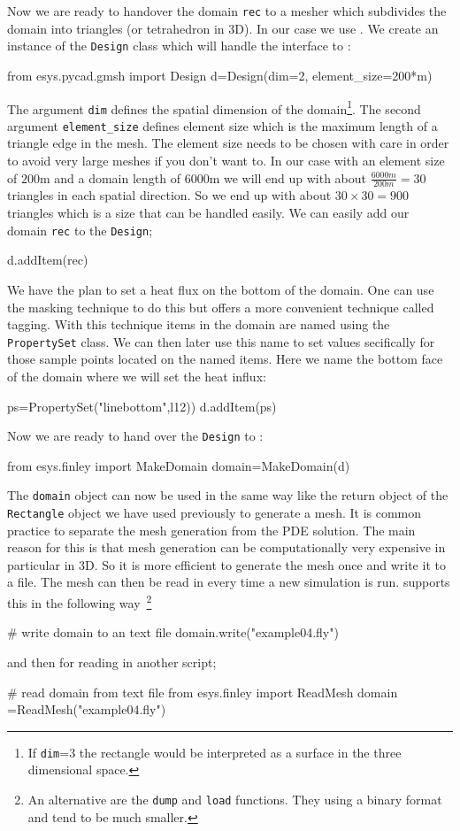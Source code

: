 Now we are ready to handover the domain \verb|rec| to a mesher which subdivides the domain into triangles (or tetrahedron in 3D). In our case we use \gmsh. We create 
an instance of the \verb|Design| class which will handle the interface to \gmsh: 
\begin{python}
from esys.pycad.gmsh import Design 
d=Design(dim=2, element_size=200*m)
\end{python}
The argument \verb|dim| defines the spatial dimension of the domain\footnote{If \texttt{dim}=3 the rectangle would be interpreted as a surface in the three dimensional space.}. The second argument \verb|element_size| defines element size which is the maximum length of a triangle edge in the mesh. The element size needs to be chosen with care in order to avoid very large meshes if you don't want to. In our case with an element size of $200$m 
and a domain length of $6000$m we will end up with about $\frac{6000m}{200m}=30$ triangles in each spatial direction. So we end up with about $30 \times 30 = 900$ triangles which is a size that can be handled easily.
We can easily add our domain \verb|rec| to the \verb|Design|;
\begin{python}
d.addItem(rec)
\end{python}
We have the plan to set a heat flux on the bottom of the domain. One can use the masking technique to do this
but \pycad offers a more convenient technique called tagging. With this technique items in the domain are
named using the \verb|PropertySet| class. We can then later use this name to set values secifically for
those sample points located on the named items. Here we name the bottom face of the 
domain where we will set the heat influx:
\begin{python}
ps=PropertySet("linebottom",l12))
d.addItem(ps)
\end{python}
Now we are ready to hand over the \verb|Design| to \FINLEY:
\begin{python}
from esys.finley import MakeDomain
domain=MakeDomain(d)
\end{python}
The \verb|domain| object can now be used in the same way like the return object of the \verb|Rectangle| 
object we have used previously to generate a mesh. It is common practice to separate the 
mesh generation from the PDE solution. The main reason for this is that mesh generation can be computationally very expensive in particular in 3D. So it is more efficient to generate the mesh once and write it to a file. The mesh
can then be read in every time a new simulation is run. \FINLEY supports this in the following 
way~\footnote{An alternative are the \texttt{dump} and \texttt{load} functions. They using a binary format and tend to be much smaller.}
\begin{python}
# write domain to an text file
domain.write("example04.fly")
\end{python}
and then for reading in another script;
\begin{python}
# read domain from text file
from esys.finley import ReadMesh
domain =ReadMesh("example04.fly")
\end{python}

